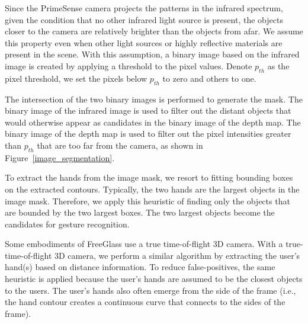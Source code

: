 Since the PrimeSense camera projects the patterns in the infrared spectrum,
given the condition that no other infrared light source is present,
the objects closer to the camera are relatively brighter than the objects
from afar. We assume this property even when other light sources or highly
reflective materials are present in the scene. With this assumption, a binary
image based on the infrared image is created by applying a threshold to the
pixel values. Denote $p_{th}$ as the pixel threshold, we set the pixels
below $p_{th}$ to zero and others to one.

The intersection of the two binary images is performed to generate the mask.
The binary image of the infrared image is used to filter out the distant
objects that would otherwise appear as candidates in the binary image of the
depth map.  The binary image of the depth map is used to filter out the
pixel intensities greater than $p_{th}$ that are too far from the camera,
as shown in Figure~\ref{image_segmentation}. 

To extract the hands from the image mask, we resort to fitting bounding boxes
on the extracted contours. Typically, the two hands are the largest objects in
the image mask. Therefore, we apply this heuristic of finding only the objects
that are bounded by the two largest boxes. The two largest objects become the
candidates for gesture recognition.

Some embodiments of FreeGlass use a true time-of-flight 3D camera.
With a true-time-of-flight 3D camera, we perform a similar algorithm by
extracting the user's hand(s) based on distance information. To reduce
false-positives, the same heuristic is applied because the user's hands are
assumed to be the closest objects to the users.  The user's hands also
often emerge from the side of the frame (i.e., the hand contour creates a
continuous curve that connects to the sides of the frame).

